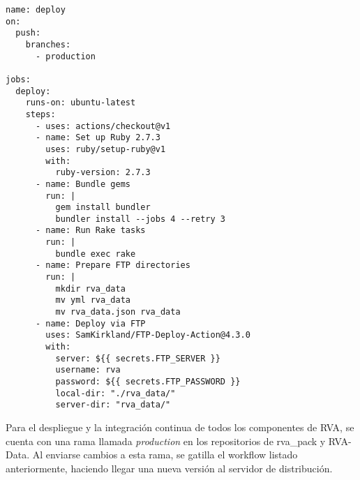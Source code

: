 \begin{longlisting}
  \begin{verbatim}  
name: deploy
on:
  push:
    branches:
      - production

jobs:
  deploy:
    runs-on: ubuntu-latest
    steps:
      - uses: actions/checkout@v1
      - name: Set up Ruby 2.7.3
        uses: ruby/setup-ruby@v1
        with:
          ruby-version: 2.7.3
      - name: Bundle gems
        run: |
          gem install bundler
          bundler install --jobs 4 --retry 3
      - name: Run Rake tasks
        run: |
          bundle exec rake
      - name: Prepare FTP directories
        run: |
          mkdir rva_data
          mv yml rva_data
          mv rva_data.json rva_data
      - name: Deploy via FTP
        uses: SamKirkland/FTP-Deploy-Action@4.3.0
        with:
          server: ${{ secrets.FTP_SERVER }}
          username: rva
          password: ${{ secrets.FTP_PASSWORD }}
          local-dir: "./rva_data/"
          server-dir: "rva_data/"
  \end{verbatim}
\end{longlisting}

\newpage

Para el despliegue y la integración continua de todos los componentes de RVA, se cuenta con una rama llamada \textit{production} en los repositorios de rva\_pack y RVA-Data. Al enviarse cambios a esta rama, se gatilla el workflow listado anteriormente, haciendo llegar una nueva versión al servidor de distribución.
